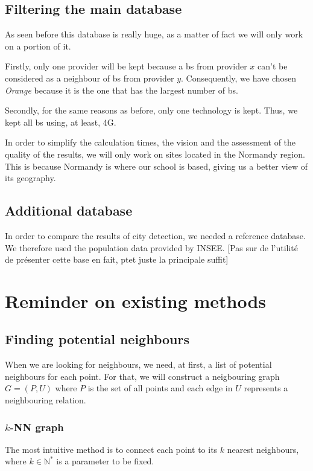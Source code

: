 \documentclass[lettersize,journal,english]{IEEEtran}
\begin{document}
\subsection{Filtering the main database}
As seen before this database is really huge, as a matter of fact we will only work on a portion of it.

Firstly, only one provider will be kept because a \acrshort{bs} from provider $x$ can't be considered as a neighbour of \acrshort{bs} from provider $y$.
Consequently, we have chosen \emph{Orange} because it is the one that has the largest number of \acrshort{bs}.

Secondly, for the same reasons as before, only one technology is kept. Thus, we kept all \acrshort{bs} using, at least, 4G.

In order to simplify the calculation times, the vision and the assessment of the quality of the results, we will only work on sites located in the Normandy region.
This is because Normandy is where our school is based, giving us a better view of its geography.

\subsection{Additional database}
In order to compare the results of city detection, we needed a reference database. We therefore used the population data provided by INSEE.
[Pas sur de l'utilité de présenter cette base en fait, ptet juste la principale suffit]

\section{Reminder on existing methods\label{sec:reminder}}
\subsection{Finding potential neighbours}
When we are looking for neighbours, we need, at first, a list of potential neighbours for each point.
For that, we will construct a neigbouring graph $G = (P, U)$ where $P$ is the set of all points and each edge in $U$ represents a neighbouring relation.

\subsubsection{$k$-NN graph}
The most intuitive method is to connect each point to its $k$ nearest neighbours, where $k \in \mathbb{N}^*$ is a parameter to be fixed. 
\end{document}
